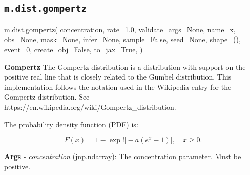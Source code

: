 \documentclass[
  letterpaper,
  DIV=11,
  numbers=noendperiod]{scrartcl}
\newenvironment{Shaded}{\begin{snugshade}}{\end{snugshade}}
\newcommand{\DecValTok}[1]{\textcolor[rgb]{0.68,0.00,0.00}{#1}}
\newcommand{\FloatTok}[1]{\textcolor[rgb]{0.68,0.00,0.00}{#1}}
\newcommand{\NormalTok}[1]{\textcolor[rgb]{0.00,0.23,0.31}{#1}}
\newcommand{\OperatorTok}[1]{\textcolor[rgb]{0.37,0.37,0.37}{#1}}
\newcommand{\StringTok}[1]{\textcolor[rgb]{0.13,0.47,0.30}{#1}}
\newcommand{\VariableTok}[1]{\textcolor[rgb]{0.07,0.07,0.07}{#1}}
\begin{document}
\subsection{\texorpdfstring{\texttt{m.dist.gompertz}}{m.dist.gompertz}}\label{gompertz}

\begin{Shaded}
\begin{Highlighting}[]
\NormalTok{m.dist.gompertz(}
\NormalTok{    concentration,}
\NormalTok{    rate}\OperatorTok{=}\FloatTok{1.0}\NormalTok{,}
\NormalTok{    validate\_args}\OperatorTok{=}\VariableTok{None}\NormalTok{,}
\NormalTok{    name}\OperatorTok{=}\StringTok{\textquotesingle{}x\textquotesingle{}}\NormalTok{,}
\NormalTok{    obs}\OperatorTok{=}\VariableTok{None}\NormalTok{,}
\NormalTok{    mask}\OperatorTok{=}\VariableTok{None}\NormalTok{,}
\NormalTok{    infer}\OperatorTok{=}\VariableTok{None}\NormalTok{,}
\NormalTok{    sample}\OperatorTok{=}\VariableTok{False}\NormalTok{,}
\NormalTok{    seed}\OperatorTok{=}\VariableTok{None}\NormalTok{,}
\NormalTok{    shape}\OperatorTok{=}\NormalTok{(),}
\NormalTok{    event}\OperatorTok{=}\DecValTok{0}\NormalTok{,}
\NormalTok{    create\_obj}\OperatorTok{=}\VariableTok{False}\NormalTok{,}
\NormalTok{    to\_jax}\OperatorTok{=}\VariableTok{True}\NormalTok{,}
\NormalTok{)}
\end{Highlighting}
\end{Shaded}

\textbf{Gompertz} The Gompertz distribution is a distribution with
support on the positive real line that is closely related to the Gumbel
distribution. This implementation follows the notation used in the
Wikipedia entry for the Gompertz distribution. See
https://en.wikipedia.org/wiki/Gompertz\_distribution.

The probability density function (PDF) is:

\[
F(x) = 1 - \exp!\bigl[-a (e^x - 1)\bigr], \quad x \ge 0.
\]

\textbf{Args} - \emph{concentration} (jnp.ndarray): The concentration
parameter. Must be positive.
\end{document}

